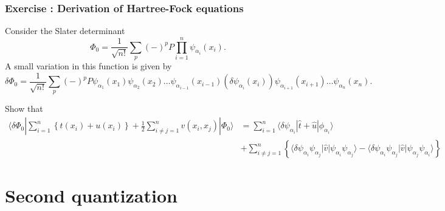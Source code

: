 \documentclass[graybox,sectrefs,envcountresetchap,open=right]{svmonodo}
\newenvironment{doconceexercise}{}{}
\newcounter{doconceexercisecounter}
\begin{document}
\begin{doconceexercise}

\subsection*{Exercise \thedoconceexercisecounter: Derivation of Hartree-Fock equations}


Consider the  Slater  determinant
\[
\Phi_{0}=\frac{1}{\sqrt{n!}}\sum_{p}(-)^{p}P
\prod_{i=1}^{n}\psi_{\alpha_{i}}(x_{i}).
\]
A small variation in this function is given by
\[
\delta\Phi_{0}=\frac{1}{\sqrt{n!}}\sum_{p}(-)^{p}P
\psi_{\alpha_{1}}(x_{1})\psi_{\alpha_{2}}(x_{2})\dots
\psi_{\alpha_{i-1}}(x_{i-1})(\delta\psi_{\alpha_{i}}(x_{i}))
\psi_{\alpha_{i+1}}(x_{i+1})\dots\psi_{\alpha_{n}}(x_{n}).
\]


Show that
\begin{align*}
\langle \delta\Phi_{0}|\sum_{i=1}^{n}\left\{t(x_{i})+u(x_{i})
\right\}+\frac{1}{2}
\sum_{i\neq j=1}^{n}v(x_{i},x_{j})|\Phi_{0}\rangle & =\sum_{i=1}^{n}\langle \delta\psi_{\alpha_{i}}|\hat{t}+\hat{u}
|\phi_{\alpha_{i}}\rangle \\
&+\sum_{i\neq j=1}^{n}\left\{\langle\delta\psi_{\alpha_{i}}
\psi_{\alpha_{j}}|\hat{v}|\psi_{\alpha_{i}}\psi_{\alpha_{j}}\rangle-
\langle\delta\psi_{\alpha_{i}}\psi_{\alpha_{j}}|\hat{v}
|\psi_{\alpha_{j}}\psi_{\alpha_{i}}\rangle\right\}
\end{align*}









\end{doconceexercise}


\chapter{Second quantization}
\label{ch:squant}
\end{document}
